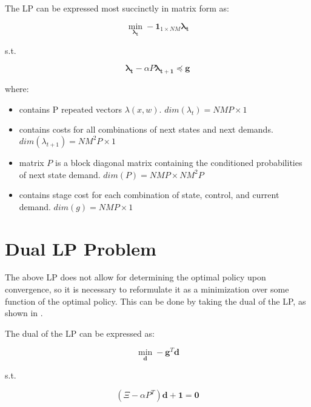 \documentclass{article}
\begin{document}
	The LP can be expressed most succinctly in matrix form as:
	
	\begin{equation}
	\min_{\boldsymbol{\lambda_{t}}} -\boldsymbol{1}_{1\times NM} \boldsymbol{\lambda_{t}}
	\end{equation}
	
	s.t.
	
	\begin{displaymath} 
	\boldsymbol{\lambda_{t}}-\alpha P\boldsymbol{\lambda_{t+1}} \preceq \boldsymbol{g}
	\end{displaymath}
	
	where:
	
	\begin{itemize}
		\item {} contains P repeated vectors $\lambda(x,w)$. $dim(\lambda_{t})=NMP\times 1$
		
		\item {} contains costs for all combinations of next states and next demands. $dim(\lambda_{t+1})=NM^{2}P\times 1$
		
		\item matrix $P$ is a block diagonal  matrix containing the conditioned probabilities of next state demand. $dim(P)=NMP\times NM^{2}P$
		
		\item {} contains stage cost for each combination of state, control, and current demand. $dim(g)=NMP\times 1$
	\end{itemize}
	
	
	
	
	\section{Dual LP Problem}
	The above LP does not allow for determining the optimal policy upon convergence, so it is necessary to reformulate it as a minimization over some function of the optimal policy. This can be done by taking the dual of the LP, as shown in \cite{4220813}.
	
	The dual of the LP can be expressed as:
	
	\begin{equation}
	\min_{\boldsymbol{d}} -\boldsymbol{g}^{T} \boldsymbol{d}
	\end{equation}
	
	s.t.
	
	\begin{displaymath} 
	(\Xi-\alpha P^{T})\boldsymbol{d} + \boldsymbol{1} = \boldsymbol{0}
	\end{displaymath}
	
\end{document}
